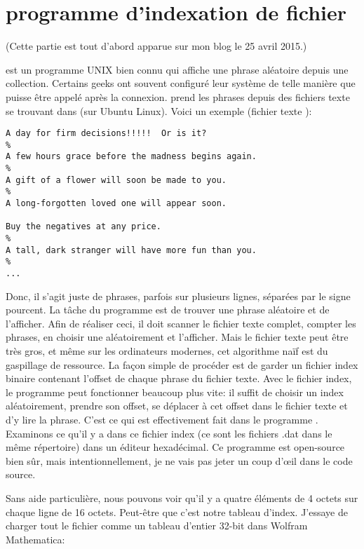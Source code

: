 \section{ programme d'indexation de fichier}

(Cette partie est tout d'abord apparue sur mon blog le 25 avril 2015.)

 est un programme UNIX bien connu qui affiche une phrase aléatoire depuis
une collection.
Certains geeks ont souvent configuré leur système de telle manière que 
puisse être appelé après la connexion.
 prend les phrases depuis des fichiers texte se trouvant dans 
(sur Ubuntu Linux).
Voici un exemple (fichier texte ):

\begin{lstlisting}
A day for firm decisions!!!!!  Or is it?
%
A few hours grace before the madness begins again.
%
A gift of a flower will soon be made to you.
%
A long-forgotten loved one will appear soon.

Buy the negatives at any price.
%
A tall, dark stranger will have more fun than you.
%
...
\end{lstlisting}

Donc, il s'agit juste de phrases, parfois sur plusieurs lignes, séparées par le
signe pourcent.
La tâche du programme  est de trouver une phrase aléatoire et de l'afficher.
Afin de réaliser ceci, il doit scanner le fichier texte complet, compter les phrases,
en choisir une aléatoirement et l'afficher.
Mais le fichier texte peut être très gros, et même sur les ordinateurs modernes, cet
algorithme naïf est du gaspillage de ressource.
La façon simple de procéder est de garder un fichier index binaire contenant l'offset
de chaque phrase du fichier texte.
Avec le fichier index, le programme  peut fonctionner beaucoup plus vite:
il suffit de choisir un index aléatoirement, prendre son offset, se déplacer à cet
offset dans le fichier texte et d'y lire la phrase.
C'est ce qui est effectivement fait dans le programme .
Examinons ce qu'il y a dans ce fichier index (ce sont les fichiers .dat dans le même
répertoire) dans un éditeur hexadécimal.
Ce programme est open-source bien sûr, mais intentionnellement, je ne vais pas jeter
un coup d'\oe{}il dans le code source.



Sans aide particulière, nous pouvons voir qu'il y a quatre éléments de 4 octets sur
chaque ligne de 16 octets.
Peut-être que c'est notre tableau d'index.
J'essaye de charger tout le fichier comme un tableau d'entier 32-bit dans Wolfram
Mathematica:


